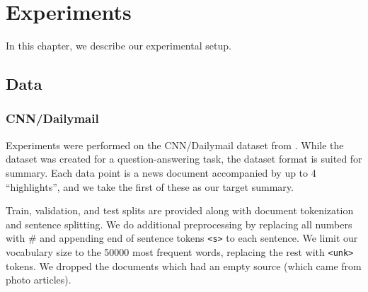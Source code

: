 \documentclass[12pt]{report}
\begin{document}
%
%

%


\chapter{Experiments}
\label{chap:experiments}

In this chapter, we describe our experimental setup.

\section{Data}

\subsection{CNN/Dailymail}

Experiments were performed on the CNN/Dailymail dataset from \cite{Hermann2015}.
While the dataset was created for a question-answering task, the dataset format is suited for summary. Each data point is a news document accompanied by up to 4 ``highlights'', and we take the first of these as our target summary.



Train, validation, and test splits are provided along with document tokenization and sentence splitting. We do additional preprocessing by replacing all numbers with \# and appending end of sentence tokens \texttt{<s>} to each sentence. We limit our vocabulary size to the 50000 most frequent words, replacing the rest with \texttt{<unk>} tokens. We dropped the documents which had an empty source (which came from photo articles).
\end{document}
